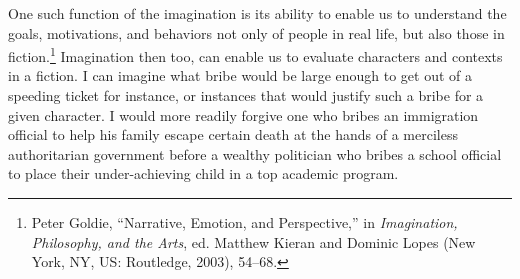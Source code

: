 \documentclass[phdthesis,12pt,final]{wuthesis}
\theoremstyle{definition}
\theoremstyle{definition}
\theoremstyle{definition}
\theoremstyle{definition}
\theoremstyle{remark}
\begin{document}
One such function of the imagination is its ability to enable us to understand the goals, motivations, and behaviors not only of people in real life, but also those in fiction.\footnote{Peter Goldie, {``Narrative, Emotion, and Perspective,''} in \emph{Imagination, {Philosophy}, and the {Arts}}, ed. Matthew Kieran and Dominic Lopes (New York, NY, US: Routledge, 2003), 54--68.} Imagination then too, can enable us to evaluate characters and contexts in a fiction. I can imagine what bribe would be large enough to get out of a speeding ticket for instance, or instances that would justify such a bribe for a given character. I would more readily forgive one who bribes an immigration official to help his family escape certain death at the hands of a merciless authoritarian government before a wealthy politician who bribes a school official to place their under-achieving child in a top academic program.
\end{document}
